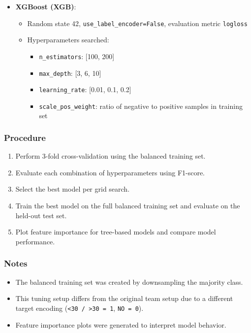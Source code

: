 \documentclass[11pt]{article}
\begin{document}
\begin{itemize}
    \item \textbf{XGBoost (XGB)}: 
    \begin{itemize}
        \item Random state 42, \texttt{use\_label\_encoder=False}, evaluation metric \texttt{logloss}
        \item Hyperparameters searched:
        \begin{itemize}
            \item \texttt{n\_estimators}: [100, 200]
            \item \texttt{max\_depth}: [3, 6, 10]
            \item \texttt{learning\_rate}: [0.01, 0.1, 0.2]
            \item \texttt{scale\_pos\_weight}: ratio of negative to positive samples in training set
        \end{itemize}
    \end{itemize}
\end{itemize}

\subsubsection{Procedure}
\begin{enumerate}
    \item Perform 3-fold cross-validation using the balanced training set.
    \item Evaluate each combination of hyperparameters using F1-score.
    \item Select the best model per grid search.
    \item Train the best model on the full balanced training set and evaluate on the held-out test set.
    \item Plot feature importance for tree-based models and compare model performance.
\end{enumerate}

\subsubsection{Notes}
\begin{itemize}
    \item The balanced training set was created by downsampling the majority class.
    \item This tuning setup differs from the original team setup due to a different target encoding (\texttt{<30 / >30 = 1}, \texttt{NO = 0}).
    \item Feature importance plots were generated to interpret model behavior.
\end{itemize}
\end{document}
